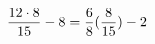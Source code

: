\documentclass[preview]{standalone}
\begin{document}
\begin{align*}
\special{dvisvgm:raw <g id='unique000'>}\frac{12 \cdot 8}{15} - 8 = \frac{6}{8} (\frac{8}{15}) - 2\special{dvisvgm:raw </g>}
\end{align*}
\end{document}
